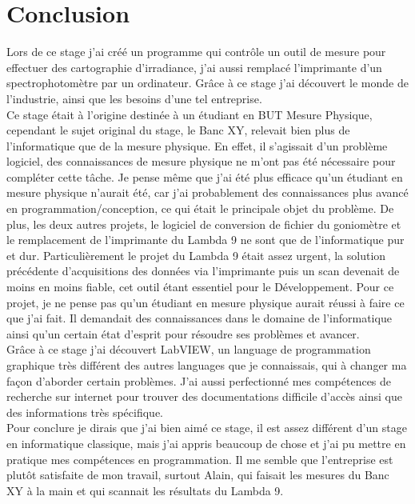 \documentclass[12pt]{article}
\begin{document}
\newpage
\section{ Conclusion }


Lors de ce stage j'ai créé un programme qui contrôle un outil de mesure pour effectuer des cartographie d'irradiance, j'ai aussi remplacé l'imprimante d'un spectrophotomètre par un ordinateur.
Grâce à ce stage j'ai découvert le monde de l'industrie, ainsi que les besoins d'une tel entreprise.
\\
Ce stage était à l'origine destinée à un étudiant en BUT Mesure Physique, cependant le sujet original du stage, le Banc XY, relevait bien plus de l'informatique que de la mesure physique.
En effet, il s'agissait d'un problème logiciel, des connaissances de mesure physique ne m'ont pas été nécessaire pour compléter cette tâche.
Je pense même que j'ai été plus efficace qu'un étudiant en mesure physique n'aurait été, car j'ai probablement des connaissances plus avancé en programmation/conception, ce qui était le principale objet du problème.
De plus, les deux autres projets, le logiciel de conversion de fichier du goniomètre et le remplacement de l'imprimante du Lambda 9 ne sont que de l'informatique pur et dur.
Particulièrement le projet du Lambda 9 était assez urgent, la solution précédente d'acquisitions des données via l'imprimante puis un scan devenait de moins en moins fiable, cet outil étant essentiel pour le Développement.
Pour ce projet, je ne pense pas qu'un étudiant en mesure physique aurait réussi à faire ce que j'ai fait.
Il demandait des connaissances dans le domaine de l'informatique ainsi qu'un certain état d'esprit pour résoudre ses problèmes et avancer.
\\
Grâce à ce stage j'ai découvert LabVIEW, un language de programmation graphique très différent des autres languages que je connaissais, qui à changer ma façon d'aborder certain problèmes.
J'ai aussi perfectionné mes compétences de recherche sur internet pour trouver des documentations difficile d'accès ainsi que des informations très spécifique.
\\
Pour conclure je dirais que j'ai bien aimé ce stage, il est assez différent d'un stage en informatique classique, mais j'ai appris beaucoup de chose et j'ai pu mettre en pratique mes compétences en programmation.
Il me semble que l'entreprise est plutôt satisfaite de mon travail, surtout Alain, qui faisait les mesures du Banc XY à la main et qui scannait les résultats du Lambda 9.

\newpage
\printglossaries
\end{document}
